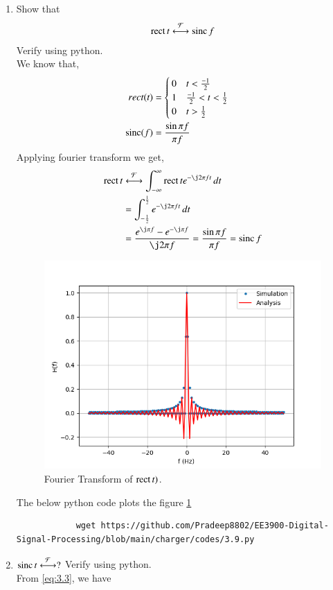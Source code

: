 \documentclass[journal,12pt,twocolumn]{IEEEtran}
\renewcommand\thesection{\arabic{section}}
\begin{document}
\begin{enumerate}[label=\thesection.\arabic*
		,ref=\thesection.\theenumi]
		The figure is plotted using the below python code.
		\begin{lstlisting}
			wget https://github.com/Pradeep8802/EE3900-Digital-Signal-Processing/blob/main/charger/codes/3.8.py
		\end{lstlisting} 
		\item Show that
		\begin{align}
			\mathop{\mathrm{rect}}{t} \overset{\mathcal{F}}{ \longleftrightarrow} \mathop{\mathrm{sinc}}{f}
		\end{align}
		Verify using python.\\
		\solution We know that,
		\begin{align}
			rect(t)&=
			\begin{cases}
				0 \quad t<\frac{-1}{2}\\
				1 \quad \frac{-1}{2}<t<\frac{1}{2}\\
				0 \quad t>\frac{1}{2}
			\end{cases}\\
			\mathop{\mathrm{sinc}}(f)&=\frac{\sin{\pi f}}{\pi f}
		\end{align}
		Applying fourier transform we get,
		\begin{align}
			\rect{t}&\system{F}\int_{-\infty}^{\infty}\rect{t} e^{-\j2\pi ft}\, dt \\
			&=\int_{-\frac{1}{2}}^{\frac{1}{2}}e^{-\j 2\pi ft}\, dt \\
			\label{eq:fourierrect}
			&=\frac{e^{\j\pi f} - e^{-\j\pi f}}{\j2\pi f} = \frac{\sin{\pi f}}{\pi f} = \sinc{f}
		\end{align}
		\begin{figure}[!ht]
			\includegraphics[width=\columnwidth]{figs/3_9.png}
			\caption{Fourier Transform of $\mathop{\mathrm{rect}}{t})$.}
			\label{fig:3.9}
		\end{figure}
		The below python code plots the figure \ref{fig:3.9}
		\begin{lstlisting}
			wget https://github.com/Pradeep8802/EE3900-Digital-Signal-Processing/blob/main/charger/codes/3.9.py
		\end{lstlisting} 
		\item $\mathop{\mathrm{sinc}}{t}\overset{\mathcal{F}}{ \longleftrightarrow} ?$  Verify using python.\\
		\solution From \eqref{eq:3.3}, we have 
		

\end{enumerate}
\end{document}
